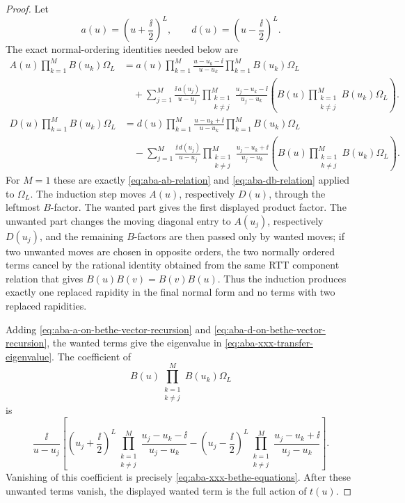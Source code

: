 \begin{proof}
Let
\[
  a(u)=\left(u+\frac{\ii}{2}\right)^L,\qquad
  d(u)=\left(u-\frac{\ii}{2}\right)^L .
\]
The exact normal-ordering identities needed below are
\begin{equation}
\begin{aligned}
  A(u)\prod_{k=1}^M B(u_k)\Omega_L
  &=
  a(u)\prod_{k=1}^M\frac{u-u_k-\ii}{u-u_k}
  \prod_{k=1}^M B(u_k)\Omega_L
  \\
  &\quad
  +\sum_{j=1}^M
  \frac{\ii\,a(u_j)}{u-u_j}
  \prod_{\substack{k=1\\k\ne j}}^M
    \frac{u_j-u_k-\ii}{u_j-u_k}
  \left(
    B(u)\prod_{\substack{k=1\\k\ne j}}^M B(u_k)\Omega_L
  \right).
\end{aligned}
\label{eq:aba-a-on-bethe-vector-recursion}
\end{equation}
\begin{equation}
\begin{aligned}
  D(u)\prod_{k=1}^M B(u_k)\Omega_L
  &=
  d(u)\prod_{k=1}^M\frac{u-u_k+\ii}{u-u_k}
  \prod_{k=1}^M B(u_k)\Omega_L
  \\
  &\quad
  -\sum_{j=1}^M
  \frac{\ii\,d(u_j)}{u-u_j}
  \prod_{\substack{k=1\\k\ne j}}^M
    \frac{u_j-u_k+\ii}{u_j-u_k}
  \left(
    B(u)\prod_{\substack{k=1\\k\ne j}}^M B(u_k)\Omega_L
  \right).
\end{aligned}
\label{eq:aba-d-on-bethe-vector-recursion}
\end{equation}
For \(M=1\) these are exactly \eqref{eq:aba-ab-relation} and
\eqref{eq:aba-db-relation} applied to \(\Omega_L\).  The induction step moves
\(A(u)\), respectively \(D(u)\), through the leftmost \(B\)-factor.  The
wanted part gives the first displayed product factor.  The unwanted part
changes the moving diagonal entry to \(A(u_j)\), respectively \(D(u_j)\), and
the remaining \(B\)-factors are then passed only by wanted moves; if two
unwanted moves are chosen in opposite orders, the two normally ordered terms
cancel by the rational identity obtained from the same RTT component relation
that gives \(B(u)B(v)=B(v)B(u)\).  Thus the induction produces exactly one
replaced rapidity in the final normal form and no terms with two replaced
rapidities.

Adding \eqref{eq:aba-a-on-bethe-vector-recursion} and
\eqref{eq:aba-d-on-bethe-vector-recursion}, the wanted terms give the
eigenvalue in \eqref{eq:aba-xxx-transfer-eigenvalue}.  The coefficient of
\[
  B(u)\prod_{\substack{k=1\\ k\neq j}}^M B(u_k)\Omega_L
\]
is
\[
  \frac{\ii}{u-u_j}
  \left[
  \left(u_j+\frac{\ii}{2}\right)^L
  \prod_{\substack{k=1\\ k\neq j}}^M
    \frac{u_j-u_k-\ii}{u_j-u_k}
  -
  \left(u_j-\frac{\ii}{2}\right)^L
  \prod_{\substack{k=1\\ k\neq j}}^M
    \frac{u_j-u_k+\ii}{u_j-u_k}
  \right].
\]
Vanishing of this coefficient is precisely
\eqref{eq:aba-xxx-bethe-equations}.  After these unwanted terms vanish, the
displayed wanted term is the full action of \(t(u)\).
\end{proof}

